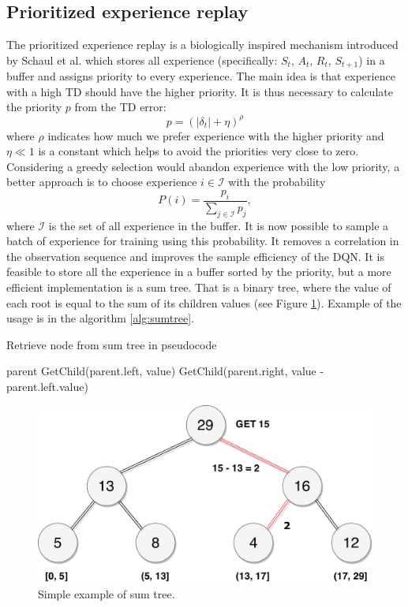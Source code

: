 \subsection{Prioritized experience replay}
The prioritized experience replay is a biologically inspired mechanism introduced by Schaul et al. \cite{schaul2015} which stores all experience (specifically: $S_t$, $A_t$, $R_{t}$, $S_{t+1}$) in a buffer and assigns priority to every experience. The main idea is that experience with a high TD should have the higher priority. It is thus necessary to calculate the priority $p$ from the TD error:
\begin{equation}
p = (|\delta_t | + \eta)^\rho
\end{equation}
where $\rho$ indicates how much we prefer experience with the higher priority and $\eta \ll 1$ is a constant which helps to avoid the priorities very close to zero. Considering a greedy selection would abandon experience with the low priority, a better approach is to choose experience $i \in \mathcal{I}$ with the probability
\begin{equation}
P(i) = \frac{p_i}{\sum\limits_{j \in \mathcal{I}} p_j},
\end{equation}
where $\mathcal{I}$ is the set of all experience in the buffer. It is now possible to sample a batch of experience for training using this probability. It removes a correlation in the observation sequence and improves the sample efficiency of the DQN. It is feasible to store all the experience in a buffer sorted by the priority, but a more efficient implementation is a sum tree. That is a binary tree, where the value of each root is equal to the sum of its children values (see Figure \ref{fig:sumtree}). Example of the usage is in the algorithm \ref{alg:sumtree}.
\begin{algorithm}
\caption{Retrieve node from sum tree in pseudocode}
\label{alg:sumtree}
\begin{algorithmic}[1]
 \Return parent \EndIf
{} 
\State \Return GetChild(parent.left, value)
\Else 
\State \Return GetChild(parent.right, value - parent.left.value)
\EndIf
\EndFunction
\end{algorithmic}
\end{algorithm}
\begin{figure}[H]
\centering
\includegraphics[scale=0.5]{fig/sumtree.pdf}
\caption[Sum tree]{Simple example of sum tree.}
\label{fig:sumtree}
\end{figure}
\clearpage
